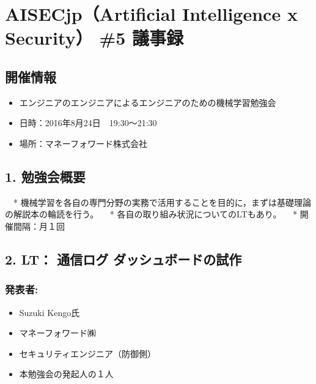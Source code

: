 \documentclass[letterpaper,10pt,dvipdfmx]{sphinxmanual}
\begin{document}
\chapter{AISECjp（Artificial Intelligence x Security） \#5 議事録}
\label{minute-05-20160824:aisecjp-artificial-intelligence-x-security-5}\label{minute-05-20160824::doc}

\section{開催情報}
\label{minute-05-20160824:id1}\begin{itemize}
\item {} 
エンジニアのエンジニアによるエンジニアのための機械学習勉強会

\item {} 
日時：2016年8月24日　19:30～21:30

\item {} 
場所：マネーフォワード株式会社

\end{itemize}


\section{1. 勉強会概要}
\label{minute-05-20160824:id2}
　* 機械学習を各自の専門分野の実務で活用することを目的に，まずは基礎理論の解説本の輪読を行う。
　* 各自の取り組み状況についてのLTもあり。
　* 開催間隔：月１回


\section{2. LT： 通信ログ ダッシュボードの試作}
\label{minute-05-20160824:lt}

\subsection{発表者:}
\label{minute-05-20160824:id3}\begin{itemize}
\item {} 
Suzuki Kengo氏

\item {} 
マネーフォワード㈱

\item {} 
セキュリティエンジニア（防御側）

\item {} 
本勉強会の発起人の１人

\end{itemize}
\end{document}
